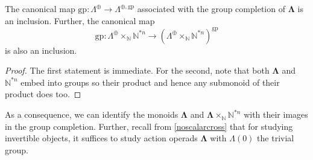 \documentclass{amsbook} %
\newcommand{\ML}{\mathbf{\Lambda}}
\numberwithin{section}{chapter}
\begin{document}
\begin{cor} \label{gpcompin} The canonical map $\mathrm{gp} \colon \Lambda^{\oplus} \to \Lambda^{\oplus, \mathrm{gp}}$ associated with the group completion of $\ML$ is an inclusion. Further, the canonical map 
\[
\mathrm{gp} \colon \Lambda^{\oplus} \times_{\mathbb{N}} \mathbb{N}^{\ast n} \to (\Lambda^{\oplus} \times_{\mathbb{N}} \mathbb{N}^{\ast n})^{\mathrm{gp}}
\]
  is also an inclusion.
\end{cor}
\begin{proof}
The first statement is immediate. For the second, note that both $\ML$ and $\mathbb{N}^{\ast n}$ embed into groups so their product and hence any submonoid of their product does too.
\end{proof}

As a consequence, we can identify the monoids $\ML$ and $\ML\times_{\mathbb{N}} \mathbb{N}^{\ast n}$ with their images in the group completion. Further, recall from \cref{noscalarcross} that for studying invertible objects, it suffices to study action operads $\ML$ with $\Lambda(0)$ the trivial group.
\end{document}
